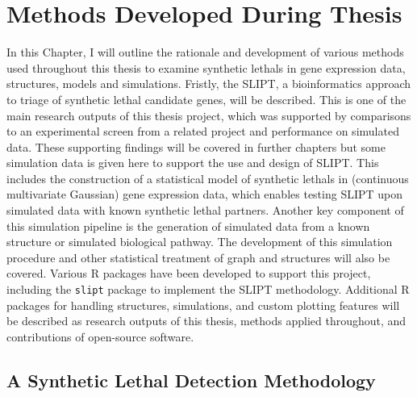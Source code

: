 \chapter{Methods Developed During Thesis}
\label{chap:methods_dev}

In this Chapter, I will outline the rationale and development of various methods used throughout this thesis to examine \glspl{synthetic lethal} in \gls{gene expression} data,  structures, models and simulations. Fristly, the \acrfull{SLIPT}, a \gls{bioinformatics} approach to triage of \gls{synthetic lethal} candidate genes, will be described. This is one of the main research outputs of this thesis project, which was supported by comparisons to an experimental screen from a related project and performance on simulated data. These supporting findings will be covered in further chapters but some simulation data is given here to support the use and design of \gls{SLIPT}. This includes the construction of a statistical model of \glspl{synthetic lethal} in (continuous multivariate Gaussian) \gls{gene expression} data, which enables testing \gls{SLIPT} upon simulated data with known \gls{synthetic lethal} partners. Another key component of this simulation pipeline is the generation of simulated data from a known  structure or simulated biological pathway. The development of this simulation procedure and other statistical treatment of graph and  structures will also be covered. Various R packages have been developed to support this project, including the \texttt{slipt} package to implement the \gls{SLIPT} methodology. Additional R packages for handling  structures, simulations, and custom plotting features will be described as research outputs of this thesis, methods applied throughout, and contributions of open-source software.

\section{A Synthetic Lethal Detection Methodology} \label{methods:SLIPT}

